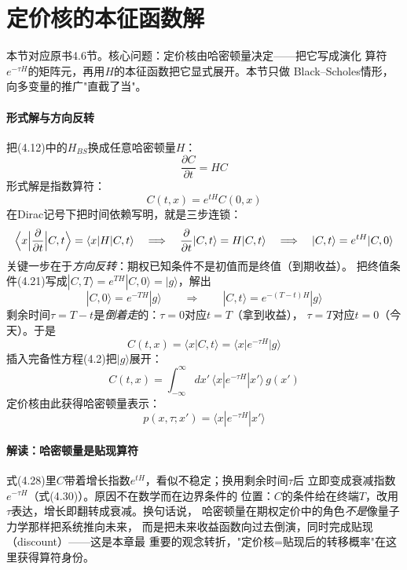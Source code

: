 \section{定价核的本征函数解}

本节对应原书4.6节。核心问题：定价核由哈密顿量决定——把它写成演化
算符$e^{-\tau H}$的矩阵元，再用$H$的本征函数把它显式展开。本节只做
Black--Scholes情形，向多变量的推广"直截了当"。

\paragraph{形式解与方向反转}
把(4.12)中的$H_{BS}$换成任意哈密顿量$H$：
\begin{equation*}
\frac{\partial C}{\partial t}=HC
\tag{4.27}
\end{equation*}
形式解是指数算符：
\begin{equation*}
C(t,x)=e^{tH}C(0,x)
\tag{4.28}
\end{equation*}
在Dirac记号下把时间依赖写明，就是三步连锁：
\begin{equation*}
\Bigl\langle x\Bigl|\frac{\partial}{\partial t}\Bigr|C,t\Bigr\rangle
=\langle x|H|C,t\rangle
\quad\Longrightarrow\quad
\frac{\partial}{\partial t}|C,t\rangle=H|C,t\rangle
\quad\Longrightarrow\quad
|C,t\rangle=e^{tH}|C,0\rangle
\end{equation*}
关键一步在于\emph{方向反转}：期权已知条件不是初值而是终值（到期收益）。
把终值条件(4.21)写成$|C,T\rangle=e^{TH}|C,0\rangle=|g\rangle$，解出
\begin{equation*}
|C,0\rangle=e^{-TH}|g\rangle
\qquad\Longrightarrow\qquad
|C,t\rangle=e^{-(T-t)H}|g\rangle
\end{equation*}
剩余时间$\tau=T-t$是\emph{倒着走}的：$\tau=0$对应$t=T$（拿到收益），
$\tau=T$对应$t=0$（今天）。于是
\begin{equation*}
C(t,x)=\langle x|C,t\rangle=\langle x|e^{-\tau H}|g\rangle
\tag{4.29}
\end{equation*}
插入完备性方程(4.2)把$|g\rangle$展开：
\begin{equation*}
C(t,x)=\int_{-\infty}^{\infty}dx'\,
\langle x|e^{-\tau H}|x'\rangle\,g(x')
\end{equation*}
定价核由此获得哈密顿量表示：
\begin{equation*}
p(x,\tau;x')=\langle x|e^{-\tau H}|x'\rangle
\tag{4.30}
\end{equation*}

\paragraph{解读：哈密顿量是贴现算符}
式(4.28)里$C$带着增长指数$e^{tH}$，看似不稳定；换用剩余时间$\tau$后
立即变成衰减指数$e^{-\tau H}$（式(4.30)）。原因不在数学而在边界条件的
位置：$C$的条件给在终端$T$，改用$\tau$表达，增长即翻转成衰减。换句话说，
哈密顿量在期权定价中的角色\emph{不是}像量子力学那样把系统推向未来，
而是把未来收益函数向过去倒演，同时完成贴现（discount）——这是本章最
重要的观念转折，"定价核=贴现后的转移概率"在这里获得算符身份。

